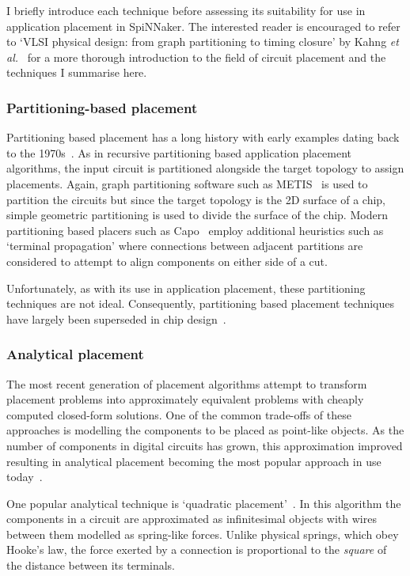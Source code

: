 			I briefly introduce each technique before assessing its suitability for
			use in application placement in SpiNNaker. The interested reader is
			encouraged to refer to `VLSI physical design: from graph partitioning to
			timing closure' by Kahng \emph{et al.}~\cite{kahng11} for a more thorough
			introduction to the field of circuit placement and the techniques I
			summarise here.
			
			\subsubsection{Partitioning-based placement}
				
				Partitioning based placement has a long history with early examples
				dating back to the 1970s~\cite{breuer77}. As in recursive partitioning
				based application placement algorithms, the input circuit is
				partitioned alongside the target topology to assign placements. Again,
				graph partitioning software such as METIS~\cite{karypis98} is used to
				partition the circuits but since the target topology is the 2D surface
				of a chip, simple geometric partitioning is used to divide the surface
				of the chip. Modern partitioning based placers such as
				Capo~\cite{roy05} employ additional heuristics such as `terminal
				propagation' where connections between adjacent partitions are
				considered to attempt to align components on either side of a cut.
				
				Unfortunately, as with its use in application placement, these
				partitioning techniques are not ideal.  Consequently, partitioning
				based placement techniques have largely been superseded in chip
				design~\cite{markov15}.
			
			\subsubsection{Analytical placement}
				
				The most recent generation of placement algorithms attempt to transform
				placement problems into approximately equivalent problems with cheaply
				computed closed-form solutions. One of the common trade-offs of these
				approaches is modelling the components to be placed as point-like
				objects. As the number of components in digital circuits has grown,
				this approximation improved resulting in analytical placement becoming
				the most popular approach in use today~\cite{markov15}.
				
				One popular analytical technique is `quadratic
				placement'~\cite{kahng11,spindler08}. In this algorithm the components
				in a circuit are approximated as infinitesimal objects with wires
				between them modelled as spring-like forces. Unlike physical springs,
				which obey Hooke's law, the force exerted by a connection is
				proportional to the \emph{square} of the distance between its
				terminals.
				
